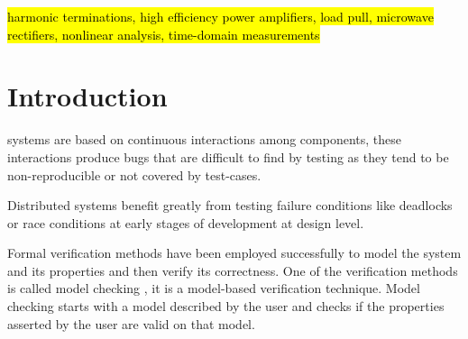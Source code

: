 \begin{IEEEkeywords}
\hl{harmonic terminations, high efficiency power amplifiers, load pull, microwave rectifiers, nonlinear analysis, time-domain measurements}
\end{IEEEkeywords}






%
\IEEEpeerreviewmaketitle













\section{Introduction}

 systems are based on continuous interactions among components, these interactions produce bugs that are difficult to find by testing as they tend to be non-reproducible or not covered by test-cases.

Distributed systems benefit greatly from testing failure conditions like deadlocks or race conditions at early stages of development at design level.

Formal verification methods have been employed successfully to model the system and its properties and then verify its correctness. One of the verification methods is called model checking \cite{ModelCheckingTLA}, it is a model-based verification technique. Model checking starts with a model described by the user and checks if the properties asserted by the user are valid on that model. 

